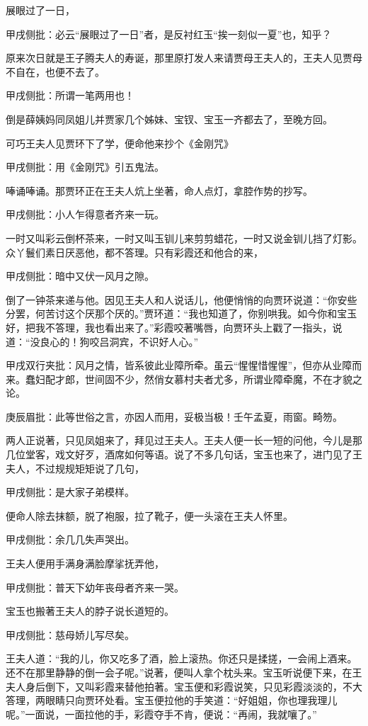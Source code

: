 \begin{parag}
    展眼过了一日，\begin{note}甲戌侧批：必云“展眼过了一日”者，是反衬红玉“挨一刻似一夏”也，知乎？\end{note}原来次日就是王子腾夫人的寿诞，那里原打发人来请贾母王夫人的，王夫人见贾母不自在，也便不去了。\begin{note}甲戌侧批：所谓一笔两用也！\end{note}倒是薛姨妈同凤姐儿并贾家几个姊妹、宝钗、宝玉一齐都去了，至晚方回。
\end{parag}


\begin{parag}
    可巧王夫人见贾环下了学，便命他来抄个《金刚咒》\begin{note}甲戌侧批：用《金刚咒》引五鬼法。\end{note}唪诵唪诵。那贾环正在王夫人炕上坐著，命人点灯，拿腔作势的抄写。\begin{note}甲戌侧批：小人乍得意者齐来一玩。\end{note}一时又叫彩云倒杯茶来，一时又叫玉钏儿来剪剪蜡花，一时又说金钏儿挡了灯影。众丫鬟们素日厌恶他，都不答理。只有彩霞还和他合的来，\begin{note}甲戌侧批：暗中又伏一风月之隙。\end{note}倒了一钟茶来递与他。因见王夫人和人说话儿，他便悄悄的向贾环说道：“你安些分罢，何苦讨这个厌那个厌的。”贾环道：“我也知道了，你别哄我。如今你和宝玉好，把我不答理，我也看出来了。”彩霞咬著嘴唇，向贾环头上戳了一指头，说道：“没良心的！狗咬吕洞宾，不识好人心。”\begin{note}甲戌双行夹批：风月之情，皆系彼此业障所牵。虽云“惺惺惜惺惺”，但亦从业障而来。蠢妇配才郎，世间固不少，然俏女慕村夫者尤多，所谓业障牵魔，不在才貌之论。\end{note}\begin{note}庚辰眉批：此等世俗之言，亦因人而用，妥极当极！壬午孟夏，雨窗。畸笏。\end{note}
\end{parag}


\begin{parag}
    两人正说著，只见凤姐来了，拜见过王夫人。王夫人便一长一短的问他，今儿是那几位堂客，戏文好歹，酒席如何等语。说了不多几句话，宝玉也来了，进门见了王夫人，不过规规矩矩说了几句，\begin{note}甲戌侧批：是大家子弟模样。\end{note}便命人除去抹额，脱了袍服，拉了靴子，便一头滚在王夫人怀里。\begin{note}甲戌侧批：余几几失声哭出。\end{note}王夫人便用手满身满脸摩挲抚弄他，\begin{note}甲戌侧批：普天下幼年丧母者齐来一哭。\end{note}宝玉也搬著王夫人的脖子说长道短的。\begin{note}甲戌侧批：慈母娇儿写尽矣。\end{note}王夫人道：“我的儿，你又吃多了酒，脸上滚热。你还只是揉搓，一会闹上酒来。还不在那里静静的倒一会子呢。”说著，便叫人拿个枕头来。宝玉听说便下来，在王夫人身后倒下，又叫彩霞来替他拍著。宝玉便和彩霞说笑，只见彩霞淡淡的，不大答理，两眼睛只向贾环处看。宝玉便拉他的手笑道：“好姐姐，你也理我理儿呢。”一面说，一面拉他的手，彩霞夺手不肯，便说：“再闹，我就嚷了。”
\end{parag}



